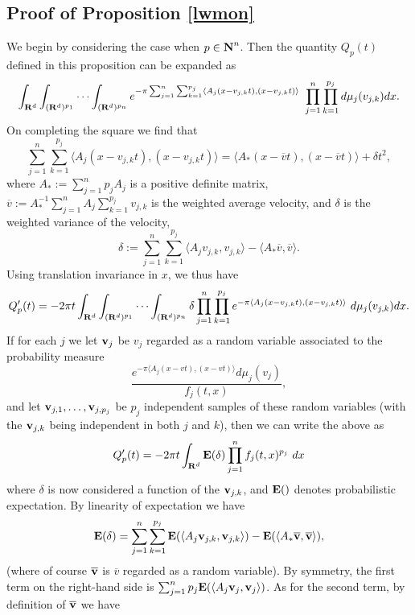\subsection*{Proof of Proposition \ref{lwmon}}
We begin by considering the case when $p\in{\hbox{\bf N}}^{n}$. Then the quantity $Q_p(t)$ defined in this
proposition can be expanded as
$$ \int_{{\bf R}^d} \int_{({\bf R}^d)^{p_{1}}}
\cdots\int_{({\bf R}^d)^{p_{n}}} e^{-\pi \sum_{j=1}^n
\sum_{k=1}^{p_{j}} \langle A_j(x-v_{j,k} t), (x-v_{j,k} t)
\rangle}\ \prod_{j=1}^n \prod_{k=1}^{p_{j}} d\mu_j(v_{j,k}) dx.$$
On completing the square we find that
$$ \sum_{j=1}^n \sum_{k=1}^{p_{j}}
\langle A_j(x-v_{j,k} t), (x-v_{j,k} t) \rangle =  \langle A_*(x -
\overline{v} t), (x-\overline{v} t) \rangle + \delta t^2,$$ where
$A_* := \sum_{j=1}^n p_{j}A_j$ is a positive definite matrix,
$\overline{v} := A_*^{-1} \sum_{j=1}^n A_j \sum_{k=1}^{p_{j}}
v_{j,k}$ is the weighted average velocity, and $\delta$ is the weighted variance of the velocity,
\begin{equation}\label{delt}
 \delta := \sum_{j=1}^n \sum_{k=1}^{p_{j}} \langle A_j v_{j,k}, v_{j,k} \rangle - \langle A_* \overline{v}, \overline{v} \rangle.
\end{equation}
Using translation invariance in $x$, we thus have
$$
 Q'_p(t) = -2\pi t \int_{{\bf R}^d} \int_{({\bf R}^d)^{p_{1}}}
\cdots\int_{({\bf R}^d)^{p_{n}}} \delta \prod_{j=1}^n
\prod_{k=1}^{p_{j}} e^{-\pi \langle A_j(x-v_{j,k} t), (x-v_{j,k}
t) \rangle}\ d\mu_j(v_{j,k})dx.$$ If for each $j$ we let ${\hbox{\bf v}}_j$ be $v_j$
regarded as a
random variable associated to the probability measure
$$ \frac{e^{-\pi \langle A_j(x-vt), (x-vt) \rangle}d\mu_j(v_j)}{f_j(t,x)},$$
and let ${\hbox{\bf v}}_{j,1}, \ldots, {\hbox{\bf v}}_{j,p_{j}}$ be $p_j$ independent
samples of these random variables (with the ${\hbox{\bf v}}_{j,k}$ being
independent in both $j$ and $k$), then we can write the above as
$$
 Q'_p(t) = -2\pi t \int_{{\bf R}^d}
{\hbox{\bf E}}(\delta) \prod_{j=1}^n f_{j}(t,x)^{p_{j}}\ dx
$$
where $\delta$ is now considered a function of the ${\hbox{\bf v}}_{j,k}$, and ${\hbox{\bf E}}()$ denotes probabilistic expectation.
By linearity of expectation we have
\begin{equation}\label{Edelt}
 {\hbox{\bf E}}(\delta) = \sum_{j=1}^n \sum_{k=1}^{p_{j}} {\hbox{\bf E}}( \langle A_j {\hbox{\bf v}}_{j,k}, {\hbox{\bf v}}_{j,k} \rangle )
- {\hbox{\bf E}}( \langle A_* \overline{{\hbox{\bf v}}}, \overline{{\hbox{\bf v}}} \rangle ),
\end{equation}
(where of course $\overline{{\hbox{\bf v}}}$ is $\overline{v}$ regarded as a random
variable).
By symmetry, the first term on the right-hand side is
$\sum_{j=1}^n p_{j} {\hbox{\bf E}}( \langle A_j {\hbox{\bf v}}_j, {\hbox{\bf v}}_j \rangle )$. As for
the second term, by definition of $\overline{{\hbox{\bf v}}}$ we have
